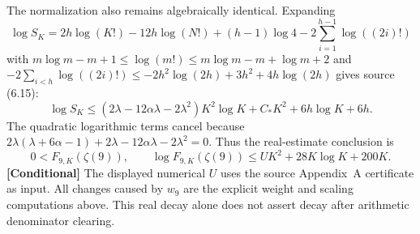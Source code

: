 The normalization also remains algebraically identical.  Expanding
\[
 \log S_K=2h\log(K!)-12h\log(N!)+(h-1)\log4
                 -2\sum_{i=1}^{h-1}\log((2i)!)
\]
with $m\log m-m+1\le\log(m!)\le m\log m-m+\log m+2$ and
$-2\sum_{i<h}\log((2i)!)\le-2h^2\log(2h)+3h^2+4h\log(2h)$
gives source (6.15):
\[
 \log S_K\le(2\lambda-12\alpha\lambda-2\lambda^2)K^2\log K
                         +C_*K^2+6h\log K+6h.
\]
The quadratic logarithmic terms cancel because
$2\lambda(\lambda+6\alpha-1)+2\lambda-12\alpha\lambda-2\lambda^2=0$.
Thus the real-estimate conclusion is
\begin{equation}
 \boxed{\quad 0<F_{9,K}(\zeta(9)),\qquad
 \log F_{9,K}(\zeta(9))\le UK^2+28K\log K+200K.\quad}
 \label{s6-final}
\end{equation}
\textbf{[Conditional]} The displayed numerical $U$ uses the source
Appendix~A certificate as input.  All changes caused by $w_9$ are the
explicit weight and scaling computations above.  This real decay alone
does not assert decay after arithmetic denominator clearing.

